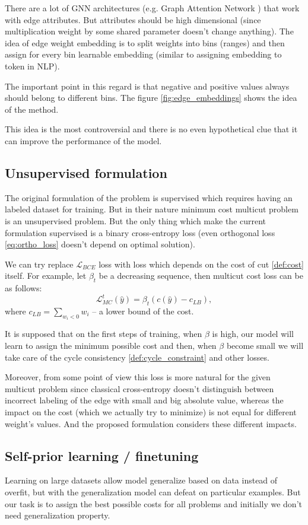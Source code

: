 \documentclass[10pt, twocolumn, a4paper]{article}
\theoremstyle{definition}
\begin{document}
There are a lot of GNN architectures (e.g. Graph Attention Network \citet{velickovic2017graph} )
that work with edge attributes. But attributes should be high dimensional (since multiplication
weight by some shared parameter doesn't change anything).
The idea of edge weight embedding is to split weights into
bins (ranges) and then assign for every bin learnable embedding
(similar to assigning embedding to token in NLP).

The important point in this regard is that negative and positive values always should belong
to different bins. The figure \ref{fig:edge_embeddings} shows
the idea of the method.

This idea is the most controversial and there is no even hypothetical clue that it can improve
the performance of the model.

\subsection{Unsupervised formulation}
The original formulation of the problem is supervised which requires having
an labeled dataset for training. But in their nature minimum cost multicut problem is an
unsupervised problem. But the only thing which make the current formulation supervised is
a binary cross-entropy loss (even orthogonal loss \eqref{eq:ortho_loss} doesn't depend on optimal solution).

We can try replace $\mathcal{L}_{BCE}$ loss with
loss which depends on the cost of cut \eqref{def:cost} itself. For example, let $\beta_t$ be
a decreasing sequence, then multicut cost loss can be as follows:
\[
    \mathcal{L}_{MC}^{t} (\hat{y}) = \beta_t \left( c(\hat{y}) - c_{LB} \right),
\]
where $c_{LB} = \sum\limits_{w_i < 0} w_i$ -- a lower bound of the cost.

It is supposed that on the first steps of training, when $\beta$ is high, our model will learn to
assign the minimum possible cost and then, when $\beta$ become small we will take care of the cycle
consistency \eqref{def:cycle_constraint} and other losses.

Moreover, from some point of view this loss is more natural for the given multicut problem since
classical cross-entropy doesn't distinguish between incorrect labeling of the edge with
small and big absolute value, whereas the impact on the cost (which we actually try to minimize)
is not equal for different weight's values. And the proposed formulation considers these different impacts.

\subsection{Self-prior learning / finetuning}
Learning on large datasets allow model generalize
based on data instead of overfit,
but with the generalization model can defeat on particular examples.
But our task is to assign the best possible costs for all problems and
initially we don't need generalization property.
\end{document}
